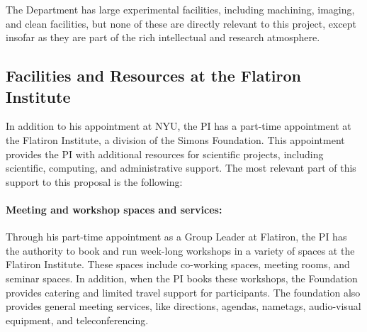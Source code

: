 \documentclass[12pt]{article}
\begin{document}
The Department has large experimental facilities, including machining,
imaging, and clean facilities, but none of these are directly relevant
to this project, except insofar as they are part of the rich
intellectual and research atmosphere.

\subsection*{Facilities and Resources at the Flatiron Institute}

In addition to his appointment at NYU, the PI has a part-time
appointment at the Flatiron Institute, a division of the Simons
Foundation.
This appointment provides the PI with additional resources for
scientific projects, including scientific, computing, and
administrative support.
The most relevant part of this support to this proposal is the
following:

\paragraph{Meeting and workshop spaces and services:}

Through his part-time appointment as a Group Leader at Flatiron, the
PI has the authority to book and run week-long workshops in a variety
of spaces at the Flatiron Institute. These spaces include co-working
spaces, meeting rooms, and seminar spaces.  In addition, when the PI
books these workshops, the Foundation provides catering and limited
travel support for participants. The foundation also provides general
meeting services, like directions, agendas, nametags, audio-visual
equipment, and teleconferencing.
\end{document}
